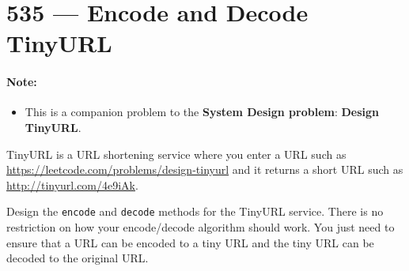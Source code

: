 \section{535 --- Encode and Decode TinyURL}
\paragraph{Note:} 
\begin{itemize}
\item This is a companion problem to the \textbf{System Design problem}: \textbf{Design TinyURL}.
\end{itemize}

TinyURL is a URL shortening service where you enter a URL such as \url{https://leetcode.com/problems/design-tinyurl} and it returns a short URL such as \url{http://tinyurl.com/4e9iAk}.

Design the \texttt{encode} and \texttt{decode} methods for the TinyURL service. There is no restriction on how your encode/decode algorithm should work. You just need to ensure that a URL can be encoded to a tiny URL and the tiny URL can be decoded to the original URL.
